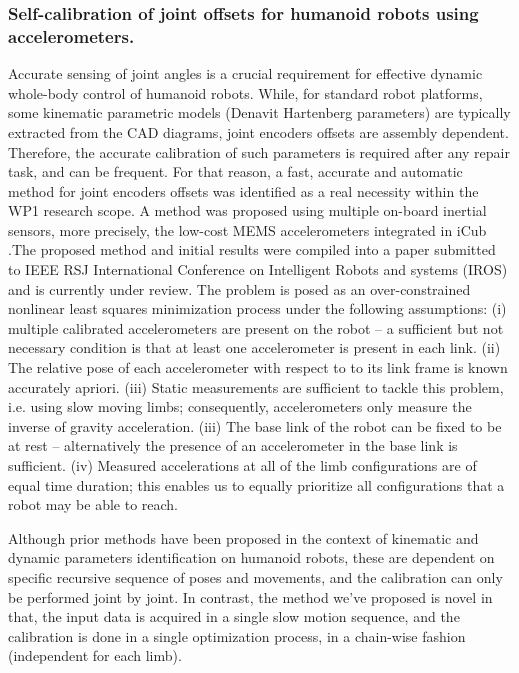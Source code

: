 

\subsubsection{Self-calibration of joint offsets for humanoid robots using accelerometers.}

Accurate sensing of joint angles is a crucial requirement for effective dynamic whole-body control of humanoid robots.
While, for standard robot platforms, some kinematic parametric models (Denavit Hartenberg parameters) are typically extracted 
from the CAD diagrams, joint encoders offsets are assembly dependent. Therefore, the accurate calibration of such parameters is 
required after any repair task, and can be frequent. For that reason, a fast, accurate and automatic method for joint encoders offsets 
was identified as a real necessity within the WP1 research scope.
A method was proposed using multiple on-board inertial sensors, more precisely,
the low-cost MEMS accelerometers integrated in iCub .The proposed method and initial results were compiled into a paper submitted to IEEE RSJ International Conference on Intelligent Robots and systems (IROS) and is currently under review.
The problem is posed as an over-constrained nonlinear least squares
minimization process under the following assumptions:
(i) multiple calibrated accelerometers are present on the robot
-- a sufficient but not necessary condition is that at least
one accelerometer is present in each link. (ii) The relative
pose of each accelerometer with respect to to its link frame
is known accurately apriori. (iii) Static measurements are
sufficient to tackle this problem, i.e. using slow moving
limbs; consequently, accelerometers only measure the inverse
of gravity acceleration. (iii) The base link of the robot
can be fixed to be at rest -- alternatively the presence of
an accelerometer in the base link is sufficient. (iv) Measured
accelerations at all of the limb configurations are of
equal time duration; this enables us to equally prioritize
all configurations that a robot may be able to reach.

Although prior methods have been proposed in the context of kinematic and dynamic parameters identification on humanoid robots,  these are dependent on specific recursive sequence of poses and movements, and the calibration can only be performed joint by joint. In contrast, the method we've proposed is novel in that, the input data is acquired in a single slow motion sequence, and the calibration is done in a single optimization process, in a chain-wise fashion (independent for each limb).


